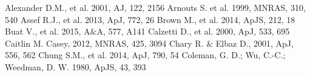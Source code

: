 \documentclass[a4paper,fleqn,usenatbib]{mnras}
\begin{document}



%


\begin{thebibliography}{99}
Alexander D.M., et al. 2001, AJ, 122, 2156
Arnouts S. et al. 1999, MNRAS, 310, 540
Assef R.J., et al. 2013, ApJ, 772, 26
Brown M., et al. 2014, ApJS, 212, 18
Buat V., et al. 2015, A$\&$A, 577, A141
Calzetti D., et al. 2000, ApJ, 533, 695
Caitlin M. Casey, 2012, MNRAS, 425, 3094
Chary R. $\&$ Elbaz D., 2001, ApJ, 556, 562
Chung S.M., et al. 2014, ApJ, 790, 54
Coleman, G. D.; Wu, C.-C.; Weedman, D. W. 1980, ApJS, 43, 393


\end{thebibliography}
\end{document}
